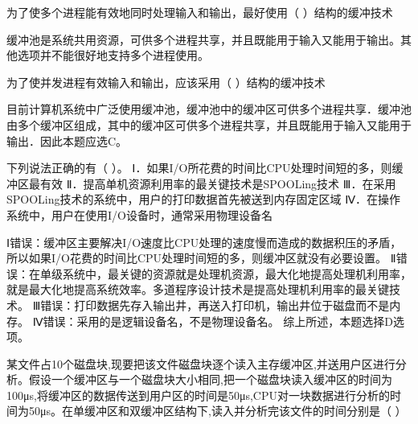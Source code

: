 \question 为了使多个进程能有效地同时处理输入和输出，最好使用（ ）结构的缓冲技术
\par{}
\begin{solution}缓冲池是系统共用资源，可供多个进程共享，并且既能用于输入又能用于输出。其他选项并不能很好地支持多个进程使用。
\end{solution}
\question 为了使并发进程有效输入和输出，应该采用（ ）结构的缓冲技术
\par{}
\begin{solution}目前计算机系统中广泛使用缓冲池，缓冲池中的缓冲区可供多个进程共享．缓冲池由多个缓冲区组成，其中的缓冲区可供多个进程共享，并且既能用于输入又能用于输出．因此本题应选C。
\end{solution}
\question 下列说法正确的有（ ）。
Ⅰ．如果I/O所花费的时间比CPU处理时间短的多，则缓冲区最有效
Ⅱ．提高单机资源利用率的最关键技术是SPOOLing技术
Ⅲ．在采用SPOOLing技术的系统中，用户的打印数据首先被送到内存固定区域
Ⅳ．在操作系统中，用户在使用I/O设备时，通常采用物理设备名
\par{}
\begin{solution}Ⅰ错误：缓冲区主要解决I/O速度比CPU处理的速度慢而造成的数据积压的矛盾，所以如果I/O花费的时间比CPU处理时间短的多，则缓冲区就没有必要设置。
Ⅱ错误：在单级系统中，最关键的资源就是处理机资源，最大化地提高处理机利用率，就是最大化地提高系统效率。多道程序设计技术是提高处理机利用率的最关键技术。
Ⅲ错误：打印数据先存入输出井，再送入打印机，输出井位于磁盘而不是内存。
Ⅳ错误：采用的是逻辑设备名，不是物理设备名。 综上所述，本题选择D选项。
\end{solution}
\question 某文件占10个磁盘块,现要把该文件磁盘块逐个读入主存缓冲区,并送用户区进行分析。假设一个缓冲区与一个磁盘块大小相同,把一个磁盘块读入缓冲区的时间为100μs,将缓冲区的数据传送到用户区的时间是50μs,CPU对一块数据进行分析的时间为50μs。在单缓冲区和双缓冲区结构下,读入并分析完该文件的时间分别是（
）
\par{}
